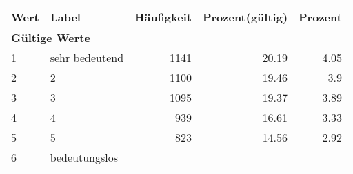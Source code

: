      \begin{longtable}{lXrrr}
     \toprule
     \textbf{Wert} & \textbf{Label} & \textbf{Häufigkeit} & \textbf{Prozent(gültig)} & \textbf{Prozent} \\
     \endhead
     \midrule
     \multicolumn{5}{l}{\textbf{Gültige Werte}}\\

     1 &
     \multicolumn{1}{X}{ sehr bedeutend   } &


       \num{1141} &
       \num[round-mode=places,round-precision=2]{20.19} &
         \num[round-mode=places,round-precision=2]{4.05} \\

     2 &
     \multicolumn{1}{X}{ 2   } &


       \num{1100} &
       \num[round-mode=places,round-precision=2]{19.46} &
         \num[round-mode=places,round-precision=2]{3.9} \\

     3 &
     \multicolumn{1}{X}{ 3   } &


       \num{1095} &
       \num[round-mode=places,round-precision=2]{19.37} &
         \num[round-mode=places,round-precision=2]{3.89} \\

     4 &
     \multicolumn{1}{X}{ 4   } &


       \num{939} &
       \num[round-mode=places,round-precision=2]{16.61} &
         \num[round-mode=places,round-precision=2]{3.33} \\

     5 &
     \multicolumn{1}{X}{ 5   } &


       \num{823} &
       \num[round-mode=places,round-precision=2]{14.56} &
         \num[round-mode=places,round-precision=2]{2.92} \\

     6 &
     \multicolumn{1}{X}{ bedeutungslos   } &



\end{longtable}

